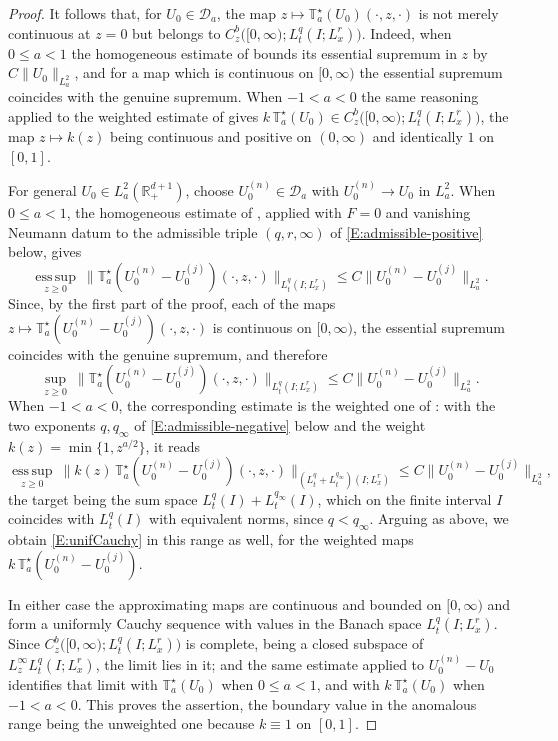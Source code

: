 \documentclass[11pt,letter]{amsart}
\def \RN {\mathbb{R}_+^{d+1}}
\numberwithin{equation}{section}
\numberwithin{equation}{section}
\begin{document}
\begin{proof}
It follows that, for $U_0\in\mathcal D_a$, the map
$z\mapsto\mathbb T_a^\star(U_0)(\cdot,z,\cdot)$ is not merely continuous at
$z=0$ but belongs to $C^b_z\bigl([0,\infty);L^q_t(I;L^r_x)\bigr)$. Indeed,
when $0\le a<1$ the homogeneous estimate of \cite[Theorem~2.4]{GS2} bounds its
essential supremum in $z$ by $C\|U_0\|_{L^2_a}$, and for a map which is
continuous on $[0,\infty)$ the essential supremum coincides with the genuine
supremum. When $-1<a<0$ the same reasoning applied to the weighted estimate of
\cite[Theorem~2.5]{GS2} gives
$k\,\mathbb T^\star_a(U_0)\in C^b_z\bigl([0,\infty);L^q_t(I;L^r_x)\bigr)$,
the map $z\mapsto k(z)$ being continuous and positive on $(0,\infty)$ and
identically $1$ on $[0,1]$.

For general $U_0\in L_a^2(\RN)$, choose
$U_0^{(n)}\in \mathcal D_a$ with $U_0^{(n)}\to U_0$ in $L_a^2$.
When $0\le a<1$, the homogeneous estimate of \cite[Theorem~2.4]{GS2}, applied
with $F=0$ and vanishing Neumann datum to the admissible triple
$(q,r,\infty)$ of \eqref{E:admissible-positive} below, gives
\[
\operatorname*{ess\,sup}_{z\ge0}\ \|\mathbb T_a^\star(U_0^{(n)}-U_0^{(j)})(\cdot,z,\cdot)\|_{L_t^q(I;L_x^r)}
\le C\|U_0^{(n)}-U_0^{(j)}\|_{L_a^2}.
\]
Since, by the first part of the proof, each of the maps
$z\mapsto \mathbb T_a^\star(U_0^{(n)}-U_0^{(j)})(\cdot,z,\cdot)$ is continuous
on $[0,\infty)$, the essential supremum coincides with the genuine
supremum, and therefore
\begin{equation}\label{E:unifCauchy}
\sup_{z\ge0}\ \|\mathbb T_a^\star(U_0^{(n)}-U_0^{(j)})(\cdot,z,\cdot)\|_{L_t^q(I;L_x^r)}
\le C\|U_0^{(n)}-U_0^{(j)}\|_{L_a^2}.
\end{equation}
When $-1<a<0$, the corresponding estimate is the weighted one of
\cite[Theorem~2.5]{GS2}: with the two exponents $q,q_\infty$ of
\eqref{E:admissible-negative} below and the weight $k(z)=\min\{1,z^{a/2}\}$, it reads
\[
\operatorname*{ess\,sup}_{z\ge0}\ \bigl\|k(z)\,\mathbb T_a^\star(U_0^{(n)}-U_0^{(j)})(\cdot,z,\cdot)\bigr\|_{\left(L_t^{q}+L^{q_\infty}_t\right)(I;L_x^r)}
\le C\|U_0^{(n)}-U_0^{(j)}\|_{L_a^2},
\]
the target being the sum space $L^q_t(I)+L^{q_\infty}_t(I)$, which on the finite
interval $I$ coincides with $L^q_t(I)$ with equivalent norms, since
$q<q_\infty$. Arguing as above, we obtain \eqref{E:unifCauchy} in this range as
well, for the weighted maps $k\,\mathbb T_a^\star(U_0^{(n)}-U_0^{(j)})$.

In either case the approximating maps are continuous and bounded on
$[0,\infty)$ and form a uniformly Cauchy sequence with values in the Banach
space $L^q_t(I;L^r_x)$. Since $C^b_z\bigl([0,\infty);L^q_t(I;L^r_x)\bigr)$ is
complete, being a closed subspace of $L^\infty_zL^q_t(I;L^r_x)$, the limit lies
in it; and the same estimate applied to $U_0^{(n)}-U_0$ identifies that limit
with $\mathbb T_a^\star(U_0)$ when $0\le a<1$, and with
$k\,\mathbb T_a^\star(U_0)$ when $-1<a<0$. This proves the assertion, the
boundary value in the anomalous range being the unweighted one because
$k\equiv1$ on $[0,1]$.
\end{proof}
\end{document}
